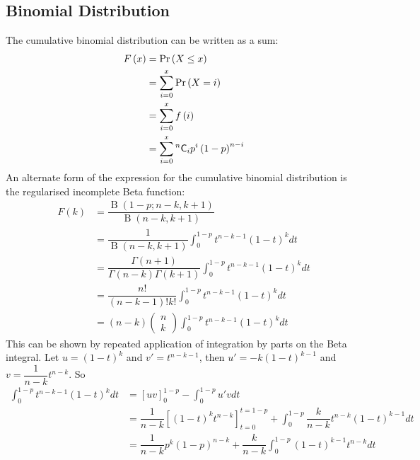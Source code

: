 \documentclass[11pt]{report} %
\begin{document}
\subsection{Binomial Distribution}

The cumulative binomial distribution can be written as a sum:
\begin{align}
F\left(x\right) &= \operatorname{Pr}\left(X \leq x\right) \\
&= \sum_{i = 0}^{x}\operatorname{Pr}\left(X = i\right) \\
&= \sum_{i = 0}^{x}f\left(i\right) \\
&= \sum_{i = 0}^{x}\mathstrut^{n}\mathsf{C}_{i}p^{i}\left(1 - p\right)^{n - i}
\end{align}
An alternate form of the expression for the cumulative binomial distribution is the regularised incomplete Beta function:
\begin{align}
F\left(k\right) &= \dfrac{\operatorname{B}\left(1 - p; n - k, k + 1\right)}{\operatorname{B}\left(n - k, k + 1\right)} \\
&= \dfrac{1}{\operatorname{B}\left(n - k, k + 1\right)}\int_{0}^{1 - p}t^{n - k - 1}\left(1 - t\right)^{k}dt \\
&= \dfrac{\Gamma\left(n + 1\right)}{\Gamma\left(n - k\right)\Gamma\left(k + 1\right)}\int_{0}^{1 - p}t^{n - k - 1}\left(1 - t\right)^{k}dt \\
&= \dfrac{n!}{\left(n - k - 1\right)!k!}\int_{0}^{1 - p}t^{n - k - 1}\left(1 - t\right)^{k}dt \\
&= \left(n - k\right)\begin{pmatrix}n \\ k\end{pmatrix}\int_{0}^{1 - p}t^{n - k - 1}\left(1 - t\right)^{k}dt
\end{align}
This can be shown by repeated application of integration by parts on the Beta integral. Let $u = \left(1 - t\right)^{k}$ and $v' = t^{n - k - 1}$, then $u' = -k\left(1 - t\right)^{k - 1}$ and $v = \dfrac{1}{n - k}t^{n - k}$. So
\begin{align}
\int_{0}^{1 - p}t^{n - k - 1}\left(1 - t\right)^{k}dt &= \left[uv\right]_{0}^{1 - p} - \int_{0}^{1 - p}u'vdt \\
&= \dfrac{1}{n - k}\left[\left(1 - t\right)^{k}t^{n - k}\right]_{t = 0}^{t = 1 - p} + \int_{0}^{1 - p}\dfrac{k}{n - k}t^{n - k}\left(1 - t\right)^{k - 1}dt \\
&= \dfrac{1}{n - k}p^{k}\left(1 - p\right)^{n - k} + \dfrac{k}{n - k}\int_{0}^{1 - p}\left(1 - t\right)^{k - 1}t^{n - k}dt
\end{align}
\end{document}
